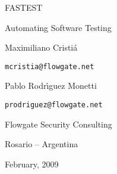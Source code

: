 \documentclass[a4paper,12pt]{article}
\begin{document}
\thispagestyle{empty}

\begin{center}

\mbox{}\vspace{7cm}

{\Huge FASTEST 

\vspace{.5cm}

Automating Software Testing}

\vspace{2cm}

\begin{multicols}{2}
{\Large Maximiliano Cristi\'{a}

{\tt mcristia@flowgate.net}

\vspace{0.5cm}

Pablo Rodr\'{\i}guez Monetti 

{\tt prodriguez@flowgate.net}}

\end{multicols}

\vspace{1cm}

{\Large Flowgate Security Consulting 

\vspace{3mm}

Rosario -- Argentina}

\vspace{2cm}

{\Large February, 2009}
\end{center}

\pagebreak




\end{document}
